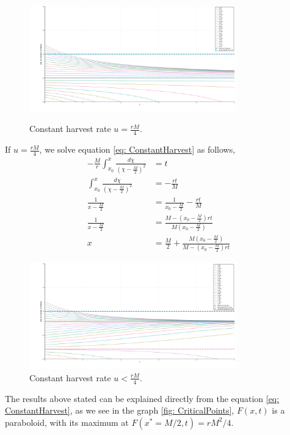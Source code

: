 \begin{figure}[H]
	\centering
	\caption{Constant harvest rate $u=\frac{rM}{4}$.}
	\includegraphics[width=0.8\textwidth]{CriticalExploitConstant.png}
	\label{fig: CriticalExploitConstantHarvest}
\end{figure}
If $u=\frac{rM}{4}$, we solve equation \ref{eq: ConstantHarvest} as follows,
\begin{align}
-\frac{M}{r}\int_{x_0}^{x}\frac{d\chi}{\left(\chi-\frac{M}{2}\right)^2}&=t\\
\int_{x_0}^{x}\frac{d\chi}{\left(\chi-\frac{M}{2}\right)^2}&=-\frac{rt}{M}\\
\frac{1}{x-\frac{M}{2}}&=\frac{1}{x_0-\frac{M}{2}}-\frac{rt}{M}\\
\frac{1}{x-\frac{M}{2}}&=\frac{M-\left(x_0-\frac{M}{2}\right)rt}{M\left(x_0-\frac{M}{2}\right)} \\
x&=\frac{M}{2}+\frac{M\left(x_0-\frac{M}{2}\right)}{M-\left(x_0-\frac{M}{2}\right)rt} 
\end{align}
\begin{figure}[H]
	\centering
	\includegraphics[width=0.8\textwidth]{SustainableConstant.png}
	\caption{Constant harvest rate $u<\frac{rM}{4}$.}
	\label{fig: SustainableConstantHarvest}
\end{figure}
The results above stated can be explained directly from the equation \ref{eq: ConstantHarvest}, as we see in the graph \ref{fig: CriticalPoints},  $F(x,t)$ is a paraboloid, with its maximum at $F(x^*=M/2,t)=rM^2/4$.

